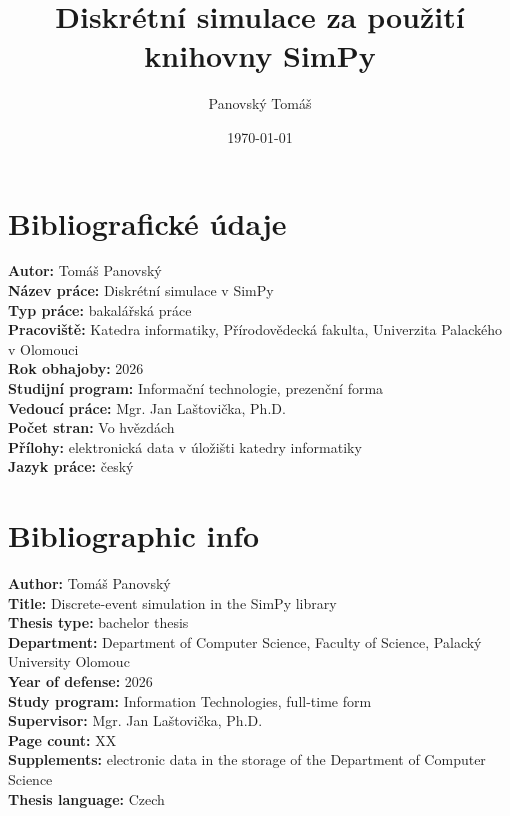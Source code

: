 \documentclass[12pt,a4paper]{article}
\title{Diskrétní simulace za použití knihovny SimPy}
\author{Panovský Tomáš}
\date{\today}
\begin{document}
\maketitle

\clearpage
\section*{Bibliografické údaje}

\textbf{Autor:} Tomáš Panovský\\
\textbf{Název práce:} Diskrétní simulace v SimPy\\
\textbf{Typ práce:} bakalářská práce\\
\textbf{Pracoviště:} Katedra informatiky, Přírodovědecká fakulta, Univerzita Palackého v Olomouci\\
\textbf{Rok obhajoby:} 2026\\
\textbf{Studijní program:} Informační technologie, prezenční forma\\
\textbf{Vedoucí práce:} Mgr. Jan Laštovička, Ph.D.\\
\textbf{Počet stran:} Vo hvězdách\\
\textbf{Přílohy:} elektronická data v úložišti katedry informatiky\\
\textbf{Jazyk práce:} český

\vspace{1cm}

\section*{Bibliographic info}

\textbf{Author:} Tomáš Panovský\\
\textbf{Title:} Discrete-event simulation in the SimPy library\\
\textbf{Thesis type:} bachelor thesis\\
\textbf{Department:} Department of Computer Science, Faculty of Science, Palacký University Olomouc\\
\textbf{Year of defense:} 2026\\
\textbf{Study program:} Information Technologies, full-time form\\
\textbf{Supervisor:} Mgr. Jan Laštovička, Ph.D.\\
\textbf{Page count:} XX\\
\textbf{Supplements:} electronic data in the storage of the Department of Computer Science\\
\textbf{Thesis language:} Czech
\end{document}
